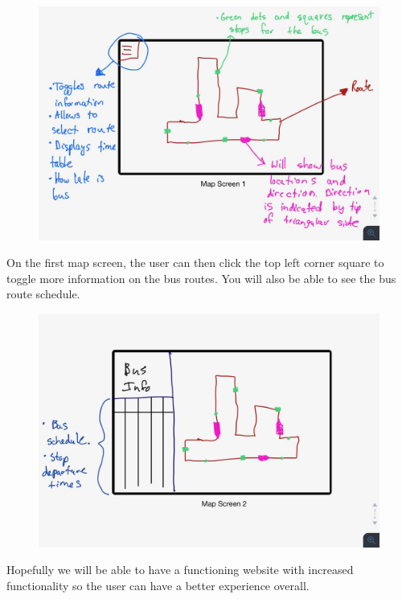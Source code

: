 \documentclass[12pt]{report}
\begin{document}
	\begin{figure}[h]
		\includegraphics[scale=0.15]{MapScreen1}
		\centering
	\end{figure}
	\newpage
	
	On the first map screen, the user can then click the top left corner square to toggle more information on the bus routes. You will also be able to see the bus route schedule.\\
	
	\begin{figure}[h]
		\includegraphics[scale=0.15]{MapScreen2}
		\centering
	\end{figure}
	
	
	Hopefully we will be able to have a functioning website with increased functionality so the user can have a better experience overall.
	
	
	
	
\end{document}
